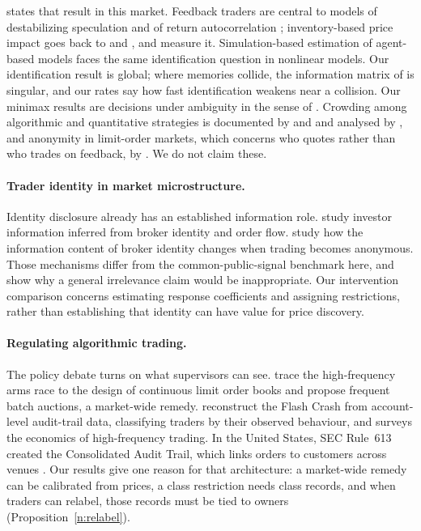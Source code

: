 \documentclass[12pt]{article}
\theoremstyle{definition}
\theoremstyle{remark}
\begin{document}
\citep{niroula2026full} states that result in this market. Feedback traders are central to models of destabilizing speculation and of return autocorrelation \citep{delong1990,cutler1990,sentana1992}; inventory-based price impact goes back to \citet{ho1981} and \citet{grossman1988}, and \citet{hendershott2014} measure it. Simulation-based estimation of agent-based models \citep{grazzini2015,platt2020} faces the same identification question in nonlinear models. Our identification result is global; where memories collide, the information matrix of \citet{rothenberg1971} is singular, and our rates say how fast identification weakens near a collision. Our minimax results are decisions under ambiguity in the sense of \citet{manski2000}. Crowding among algorithmic and quantitative strategies is documented by \citet{chaboud2014} and \citet{khandani2011} and analysed by \citet{stein2009}, and anonymity in limit-order markets, which concerns who quotes rather than who trades on feedback, by \citet{foucault2007}. We do not claim these.

\paragraph{Trader identity in market microstructure.} Identity disclosure already has an established information role. \citet{linnainmaa2012} study investor information inferred from broker identity and order flow. \citet{frino2010} study how the information content of broker identity changes when trading becomes anonymous. Those mechanisms differ from the common-public-signal benchmark here, and show why a general irrelevance claim would be inappropriate. Our intervention comparison concerns estimating response coefficients and assigning restrictions, rather than establishing that identity can have value for price discovery.

\paragraph{Regulating algorithmic trading.} The policy debate turns on what supervisors can see. \citet{budish2015} trace the high-frequency arms race to the design of continuous limit order books and propose frequent batch auctions, a market-wide remedy. \citet{kirilenko2017} reconstruct the Flash Crash from account-level audit-trail data, classifying traders by their observed behaviour, and \citet{menkveld2016} surveys the economics of high-frequency trading. In the United States, SEC Rule~613 created the Consolidated Audit Trail, which links orders to customers across venues \citep{sec2012cat}. Our results give one reason for that architecture: a market-wide remedy can be calibrated from prices, a class restriction needs class records, and when traders can relabel, those records must be tied to owners (Proposition~\ref{n:relabel}).
\end{document}
